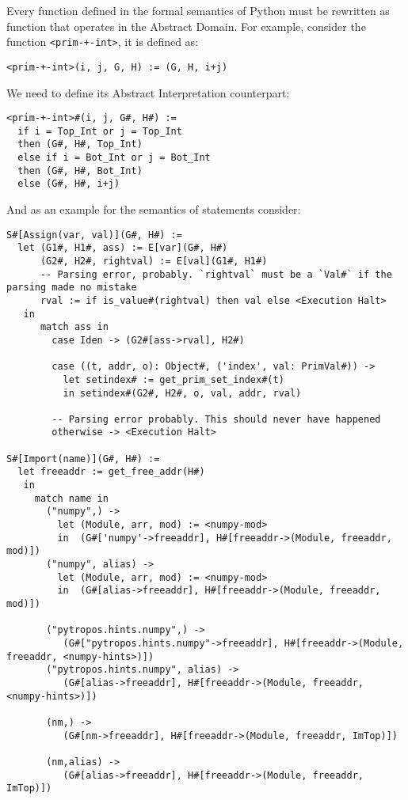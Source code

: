 Every function defined in the formal semantics of Python must be
rewritten as function that operates in the Abstract Domain. For example,
consider the function \texttt{\textless{}prim-+-int\textgreater{}}, it
is defined as:

\texttt{\textless{}prim-+-int\textgreater{}(i,\ j,\ G,\ H)\ :=\ (G,\ H,\ i+j)}

We need to define its Abstract Interpretation counterpart:

\begin{verbatim}
<prim-+-int>#(i, j, G#, H#) :=
  if i = Top_Int or j = Top_Int
  then (G#, H#, Top_Int)
  else if i = Bot_Int or j = Bot_Int
  then (G#, H#, Bot_Int)
  else (G#, H#, i+j)
\end{verbatim}

And as an example for the semantics of statements consider:

\begin{verbatim}
S#[Assign(var, val)](G#, H#) :=
  let (G1#, H1#, ass) := E[var](G#, H#)
      (G2#, H2#, rightval) := E[val](G1#, H1#)
      -- Parsing error, probably. `rightval` must be a `Val#` if the parsing made no mistake
      rval := if is_value#(rightval) then val else <Execution Halt>
   in
      match ass in
        case Iden -> (G2#[ass->rval], H2#)

        case ((t, addr, o): Object#, ('index', val: PrimVal#)) ->
          let setindex# := get_prim_set_index#(t)
          in setindex#(G2#, H2#, o, val, addr, rval)

        -- Parsing error probably. This should never have happened
        otherwise -> <Execution Halt>

S#[Import(name)](G#, H#) :=
  let freeaddr := get_free_addr(H#)
   in
     match name in
       ("numpy",) ->
         let (Module, arr, mod) := <numpy-mod>
         in  (G#['numpy'->freeaddr], H#[freeaddr->(Module, freeaddr, mod)])
       ("numpy", alias) ->
         let (Module, arr, mod) := <numpy-mod>
         in  (G#[alias->freeaddr], H#[freeaddr->(Module, freeaddr, mod)])

       ("pytropos.hints.numpy",) ->
          (G#["pytropos.hints.numpy"->freeaddr], H#[freeaddr->(Module, freeaddr, <numpy-hints>)])
       ("pytropos.hints.numpy", alias) ->
          (G#[alias->freeaddr], H#[freeaddr->(Module, freeaddr, <numpy-hints>)])

       (nm,) ->
          (G#[nm->freeaddr], H#[freeaddr->(Module, freeaddr, ImTop)])

       (nm,alias) ->
          (G#[alias->freeaddr], H#[freeaddr->(Module, freeaddr, ImTop)])
\end{verbatim}

